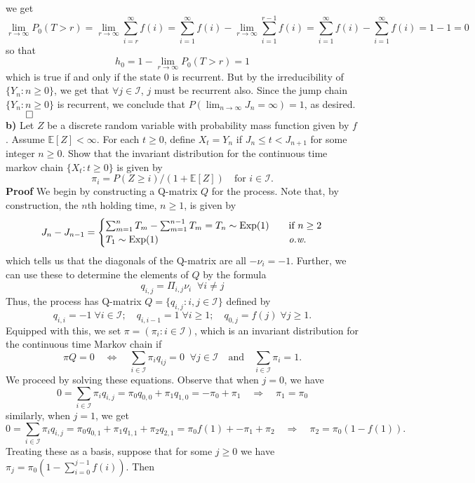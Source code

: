 \documentclass[11pt, letterpaper]{article}
\newcommand{\mbb}[1]{\mathbb{#1}}
\newcommand{\mc}[1]{\mathcal{#1}}
\begin{document}
    we get
    \[\lim_{r\rightarrow\infty}P_0(T>r)=\lim_{r\rightarrow\infty}\sum_{i=r}^\infty f(i)=\sum_{i=1}^\infty f(i)-\lim_{r\rightarrow\infty}\sum_{i=1}^{r-1}f(i)=\sum_{i=1}^\infty f(i)-\sum_{i=1}^\infty f(i)=1-1=0\]
    so that
    \[h_0=1-\lim_{r\rightarrow\infty}P_0(T>r)=1\]
    which is true if and only if the state $0$ is recurrent. But by the irreducibility of $\{Y_n:n\geq 0\}$, we get that $\forall j\in\mc{I}$, $j$ must be recurrent also. Since the jump chain $\{Y_n:n\geq 0\}$ is recurrent, we conclude that $P(\lim_{n\rightarrow\infty}J_n=\infty)=1$, as desired.\hfill{$\qed$}\\[10pt]
    {\bf b)} Let $Z$ be a discrete random variable with probability mass function given by $f$. Assume $\mbb{E}[Z]<\infty$. For each $t\geq 0$, define $X_t=Y_n$ if $J_n\leq t<J_{n+1}$ for some integer $n\geq 0$.
    Show that the invariant distribution for the continuous time markov chain $\{X_t:t\geq 0\}$ is given by
    \[\pi_i=P(Z\geq i)/(1+\mbb{E}[Z])\quad\text{for $i\in\mc{I}$}.\]
    {\bf Proof} We begin by constructing a Q-matrix $Q$ for the process. Note that, by construction, the $n$th holding time, $n\geq 1$, is given by
    \[J_{n}-J_{n-1}=\begin{cases}
        \sum_{m=1}^{n}T_m-\sum_{m=1}^{n-1}T_m=T_{n}\sim\text{Exp}(1)\quad&\text{if $n\geq 2$}\\
        T_1\sim\text{Exp}(1)\quad&\text{{\it o.w.}}
    \end{cases}\]
    which tells us that the diagonals of the Q-matrix are all $-\nu_i=-1$. Further, we can use these to determine the elements of $Q$ by the formula
    \[q_{i,j}=\Pi_{i,j}\nu_i\;\;\forall i\neq j\]
    Thus, the process has Q-matrix $Q=\{q_{i,j}:i,j\in\mc{I}\}$ defined by
    \[q_{i,i}=-1\;\forall i\in\mc{I};\quad q_{i,i-1}=1\;\forall i\geq 1;\quad q_{0,j}=f(j)\;\forall j\geq 1.\]
    Equipped with this, we set $\pi=(\pi_i:i\in\mc{I})$, which is an invariant distribution for the continuous time Markov chain if
    \[\pi Q=0\quad\Leftrightarrow\quad \sum_{i\in\mc{I}}\pi_iq_{ij}=0\;\;\forall j\in\mc{I}\quad\text{and}\quad\sum_{i\in\mc{I}}\pi_i=1.\]
    We proceed by solving these equations. Observe that when $j=0$, we have
    \[0=\sum_{i\in\mc{I}}\pi_iq_{i,j}=\pi_0q_{0,0}+\pi_1q_{1,0}=-\pi_0+\pi_1\quad\Rightarrow\quad \pi_1=\pi_0\]
    similarly, when $j=1$, we get
    \[0=\sum_{i\in\mc{I}}\pi_iq_{i,j}=\pi_0q_{0,1}+\pi_1q_{1,1}+\pi_2q_{2,1}=\pi_0f(1)+-\pi_1+\pi_2\quad\Rightarrow\quad \pi_2=\pi_0(1-f(1)).\]
    Treating these as a basis, suppose that for some $j\geq 0$ we have $\pi_j=\pi_0(1-\sum_{i=0}^{j-1}f(i))$. Then
\end{document}
